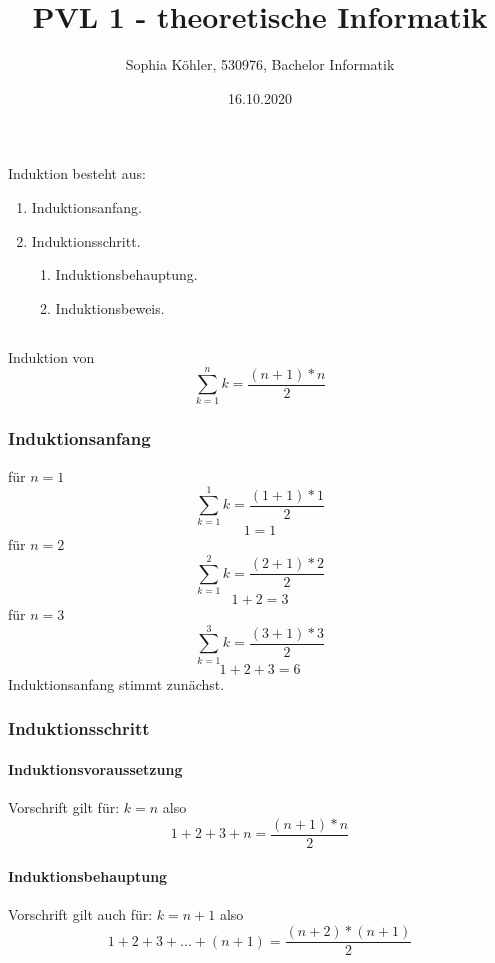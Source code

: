 \documentclass{article}
\title{PVL 1 - theoretische Informatik}
\author{Sophia Köhler, 530976, Bachelor Informatik}
\date{16.10.2020}
\begin{document}
\maketitle

\section{}
Induktion besteht aus:
\begin{enumerate}
  \item Induktionsanfang.
  \item Induktionsschritt.
  	\begin{enumerate}
	  \item Induktionsbehauptung.
  	\item Induktionsbeweis.
  	\end{enumerate}
\end{enumerate}
\subsection{}
Induktion von \[ \sum_{k=1}^{n}{k} = \frac{(n+1)*n}{2} \]
\subsubsection{Induktionsanfang}

für $n=1$
\[ \sum_{k=1}^{1}{k} = \frac{(1+1)*1}{2} \]
\[ 1 = 1 \]
\newline
für $n=2$
\[ \sum_{k=1}^{2}{k} = \frac{(2+1)*2}{2} \]
\[ 1+2 = 3 \]
\newline
\clearpage
für $n=3$
\[ \sum_{k=1}^{3}{k} = \frac{(3+1)*3}{2} \]
\[ 1+2+3 = 6 \]
\newline
Induktionsanfang stimmt zunächst.
\subsubsection{Induktionsschritt}
\paragraph{Induktionsvoraussetzung}\mbox{}

Vorschrift gilt für: $k=n$ also \[1+2+3+n = \frac{(n+1)*n}{2} \]

\paragraph{Induktionsbehauptung}\mbox{}

Vorschrift gilt auch für: $k=n+1$ also \[1+2+3+...+(n+1) = \frac{(n+2)*(n+1)}{2} \]
\end{document}
